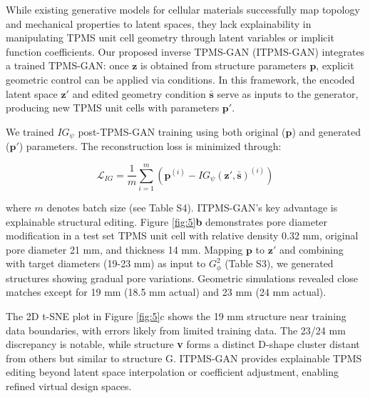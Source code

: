 \documentclass[preprint,review,12pt,authoryear]{elsarticle}
\begin{document}
While existing generative models for cellular materials successfully map topology and mechanical properties to latent spaces, they lack explainability in manipulating TPMS unit cell geometry through latent variables or implicit function coefficients. Our proposed inverse TPMS-GAN (ITPMS-GAN) integrates a trained TPMS-GAN: once $\boldsymbol{z}$ is obtained from structure parameters $\boldsymbol{p}$, explicit geometric control can be applied via conditions. In this framework, the encoded latent space $\boldsymbol{z}'$ and edited geometry condition $\bar{\boldsymbol{s}}$ serve as inputs to the generator, producing new TPMS unit cells with parameters $\boldsymbol{p}'$.

We trained $IG_\psi$ post-TPMS-GAN training using both original ($\boldsymbol{p}$) and generated ($\boldsymbol{p}'$) parameters. The reconstruction loss is minimized through:

\begin{equation}
    \mathcal{L}_{IG} = \frac{1}{m}\sum_{i=1}^m\left(\boldsymbol{p}^{(i)}-IG_\psi(\boldsymbol{z}',\bar{\boldsymbol{s}})^{(i)}\right)
\label{eq:21}
\end{equation}

where $m$ denotes batch size (see Table S4). ITPMS-GAN's key advantage is explainable structural editing. Figure \ref{fig:5}\textbf{b} demonstrates pore diameter modification in a test set TPMS unit cell with relative density 0.32 mm, original pore diameter 21 mm, and thickness 14 mm. Mapping $\boldsymbol{p}$ to $\boldsymbol{z}'$ and combining with target diameters (19-23 mm) as input to $G_\phi^2$ (Table S3), we generated structures showing gradual pore variations. Geometric simulations revealed close matches except for 19 mm (18.5 mm actual) and 23 mm (24 mm actual).

The 2D t-SNE plot in Figure \ref{fig:5}c shows the 19 mm structure near training data boundaries, with errors likely from limited training data. The 23/24 mm discrepancy is notable, while structure \textbf{v} forms a distinct D-shape cluster distant from others but similar to structure G. ITPMS-GAN provides explainable TPMS editing beyond latent space interpolation or coefficient adjustment, enabling refined virtual design spaces.
\end{document}
